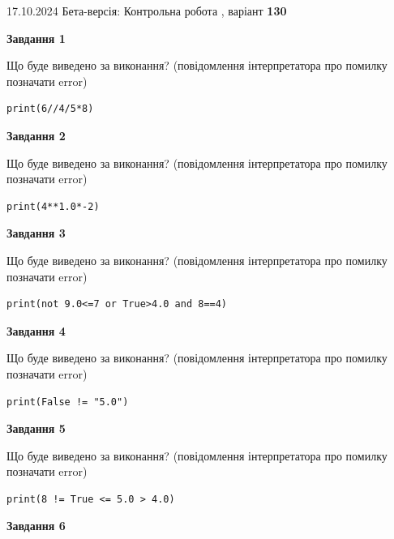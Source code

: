 \documentclass[12pt, ukrainian]{article}
\begin{document}
{\Large{17.10.2024 Бета-версія: Контрольна робота , варіант  \No \textbf { 130 }\par}}
{
\begin {large}
{\begin {center}\textbf{Завдання 1}\end {center}}

Що буде виведено за виконання? (повідомлення інтерпретатора про помилку позначати error)\par
\begin{verbatim}
print(6//4/5*8)
\end{verbatim}

{\begin {center}\textbf{Завдання 2}\end {center}}

Що буде виведено за виконання? (повідомлення інтерпретатора про помилку позначати error)\par
\begin{verbatim}
print(4**1.0*-2)
\end{verbatim}

{\begin {center}\textbf{Завдання 3}\end {center}}

Що буде виведено за виконання? (повідомлення інтерпретатора про помилку позначати error)\par
\begin{verbatim}
print(not 9.0<=7 or True>4.0 and 8==4)
\end{verbatim}

{\begin {center}\textbf{Завдання 4}\end {center}}

Що буде виведено за виконання? (повідомлення інтерпретатора про помилку позначати error)\par
\begin{verbatim}
print(False != "5.0")
\end{verbatim}

{\begin {center}\textbf{Завдання 5}\end {center}}

Що буде виведено за виконання? (повідомлення інтерпретатора про помилку позначати error)\par
\begin{verbatim}
print(8 != True <= 5.0 > 4.0)
\end{verbatim}

{\begin {center}\textbf{Завдання 6}\end {center}}


\end{large}}
\end{document}
